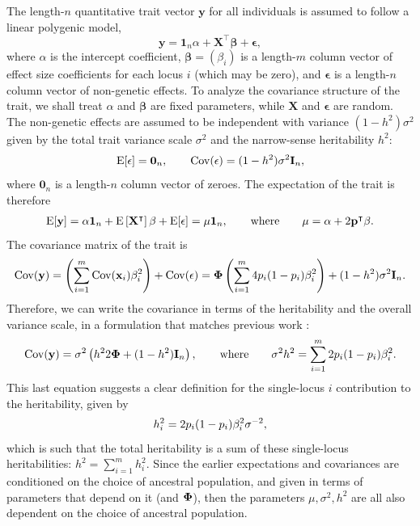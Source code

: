 \documentclass[11pt]{article}
\newcommand{\kinMat}{%
  \ensuremath{%
    \mathbf{\Phi}
  }%
  \xspace%
}%
\begin{document}
The length-$n$ quantitative trait vector $\mathbf{y}$ for all individuals is assumed to follow a linear polygenic model,
\begin{equation}
  \label{eq:trait}
  \mathbf{y}
  =
  \mathbf{1}_n \alpha + \mathbf{X}^\intercal \mathbf{\beta}  + \mathbf{\epsilon},
\end{equation}
where $\alpha$ is the intercept coefficient, $\mathbf{\beta} = (\beta_i)$ is a length-$m$ column vector of effect size coefficients for each locus $i$ (which may be zero), and $\mathbf{\epsilon}$ is a length-$n$ column vector of non-genetic effects.
To analyze the covariance structure of the trait, we shall treat $\alpha$ and $\mathbf{\beta}$ are fixed parameters, while $\mathbf{X}$ and $\mathbf{\epsilon}$ are random.
The non-genetic effects are assumed to be independent with variance $(1-h^2) \sigma^2$ given by the total trait variance scale $\sigma^2$ and the narrow-sense heritability $h^2$:
\begin{align*}
  \operatorname{E}[\mathbf{\epsilon}]
  =
  \mathbf{0}_n
  ,
  \quad\quad
  \operatorname{Cov}(\mathbf{\epsilon})
  =
  (1-h^2) \sigma^2 \mathbf{I}_n
  ,
\end{align*}
where $\mathbf{0}_n$ is a length-$n$ column vector of zeroes.
The expectation of the trait is therefore
\begin{align*}
  \operatorname{E}[\mathbf{y}]
  = \alpha \mathbf{1}_n + \operatorname{E} \left[ \mathbf{X}^\intercal \right] \mathbf{\beta} + \operatorname{E}[\mathbf{\epsilon}]
  = \mu \mathbf{1}_n
  , \quad\quad \text{where} \quad\quad
  \mu 
  =
  \alpha + 2 \mathbf{p}^\intercal \mathbf{\beta}
  .
\end{align*}
The covariance matrix of the trait is
\begin{align*}
  \Cov(\mathbf{y})
  =
  \left( \sum_{i=1}^m \Cov(\mathbf{x}_i) \beta_i^2 \right) + \Cov(\mathbf{\epsilon})
  =
  \kinMat \left( \sum_{i=1}^m 4 \pit (1-\pit) \beta_i^2 \right) + (1-h^2) \sigma^2 \mathbf{I}_n
  .
\end{align*}
Therefore, we can write the covariance in terms of the heritability and the overall variance scale, in a formulation that matches previous work \citep{yang_common_2010, yang_gcta:_2011, speed_improved_2012}:
\begin{equation*}
  \Cov(\mathbf{y})
  =
  \sigma^2 \left( h^2 2 \kinMat  + (1-h^2) \mathbf{I}_n \right)
  , \quad\quad \text{where} \quad\quad
  \sigma^2 h^2 
  = 
  \sum_{i=1}^m 2 \pit (1-\pit) \beta_i^2
  .
\end{equation*}
This last equation suggests a clear definition for the single-locus $i$ contribution to the heritability, given by
\begin{equation}
  \label{eq:herit_per_locus}
  h^2_i
  =
  2  p_i   (1- p_i  ) \beta_i^2 \sigma^{-2},
\end{equation}
which is such that the total heritability is a sum of these single-locus heritabilities: $h^2 = \sum_{i=1}^m h^2_i$.
Since the earlier expectations and covariances are conditioned on the choice of ancestral population, and given in terms of parameters that depend on it (\pit and $\kinMat$), then the parameters $\mu, \sigma^2, h^2$ are all also dependent on the choice of ancestral population.
\end{document}
